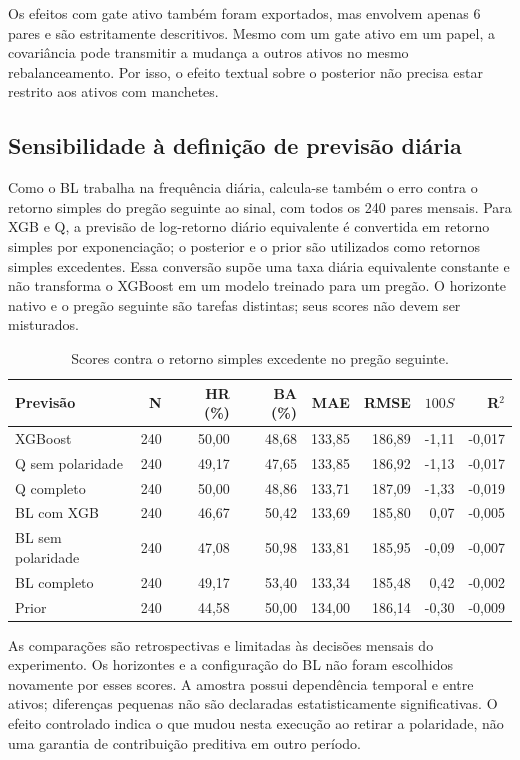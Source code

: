 Os efeitos com gate ativo também foram exportados, mas envolvem apenas 6 pares e são estritamente descritivos. Mesmo com um gate ativo em um papel, a covariância pode transmitir a mudança a outros ativos no mesmo rebalanceamento. Por isso, o efeito textual sobre o posterior não precisa estar restrito aos ativos com manchetes.

\subsection{Sensibilidade à definição de previsão diária}

Como o BL trabalha na frequência diária, calcula-se também o erro contra o retorno simples do pregão seguinte ao sinal, com todos os 240 pares mensais. Para XGB e Q, a previsão de log-retorno diário equivalente é convertida em retorno simples por exponenciação; o posterior e o prior são utilizados como retornos simples excedentes. Essa conversão supõe uma taxa diária equivalente constante e não transforma o XGBoost em um modelo treinado para um pregão. O horizonte nativo e o pregão seguinte são tarefas distintas; seus scores não devem ser misturados.

\begin{table}[H]\centering
\caption{Scores contra o retorno simples excedente no pregão seguinte.}
{\footnotesize\begin{tabular}{lrrrrrrr}\hline
Previsão & N & HR (\%) & BA (\%) & MAE & RMSE & $100S$ & R$^2$\\ \hline
XGBoost & 240 & 50,00 & 48,68 & 133,85 & 186,89 & -1,11 & -0,017\\
Q sem polaridade & 240 & 49,17 & 47,65 & 133,85 & 186,92 & -1,13 & -0,017\\
Q completo & 240 & 50,00 & 48,86 & 133,71 & 187,09 & -1,33 & -0,019\\
BL com XGB & 240 & 46,67 & 50,42 & 133,69 & 185,80 & 0,07 & -0,005\\
BL sem polaridade & 240 & 47,08 & 50,98 & 133,81 & 185,95 & -0,09 & -0,007\\
BL completo & 240 & 49,17 & 53,40 & 133,34 & 185,48 & 0,42 & -0,002\\
Prior & 240 & 44,58 & 50,00 & 134,00 & 186,14 & -0,30 & -0,009\\
\hline\end{tabular}}\par{}\end{table}

As comparações são retrospectivas e limitadas às decisões mensais do experimento. Os horizontes e a configuração do BL não foram escolhidos novamente por esses scores. A amostra possui dependência temporal e entre ativos; diferenças pequenas não são declaradas estatisticamente significativas. O efeito controlado indica o que mudou nesta execução ao retirar a polaridade, não uma garantia de contribuição preditiva em outro período.


